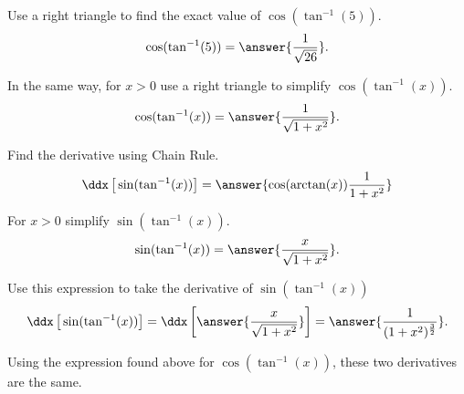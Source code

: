 \documentclass{ximera}
\author{Nela Lakos \and Kyle Parsons \and Bobby Ramsey}
\begin{document}
\begin{exercise}

Use a right triangle to find the exact value of $\cos(\tan^{-1}(5))$.
\[
\cos(\tan^{-1}(5)) = \answer{\frac{1}{\sqrt{26}}}.
\]

In the same way, for $x>0$ use a right triangle to simplify $\cos(\tan^{-1}(x))$.
\[
\cos(\tan^{-1}(x)) = \answer{\frac{1}{\sqrt{1+x^2}}}.
\]

Find the derivative using Chain Rule.
\[
\ddx\left[\vphantom{\ddx}\sin(\tan^{-1}(x))\right] = \answer{\cos(\arctan(x))\frac{1}{1+x^2}}
\]


For $x>0$ simplify $\sin(\tan^{-1}(x))$.
\[
\sin(\tan^{-1}(x)) = \answer{\frac{x}{\sqrt{1+x^2}}}.
\]

Use this expression to take the derivative of $\sin(\tan^{-1}(x))$
\[
\ddx\left[\vphantom{\ddx}\sin(\tan^{-1}(x))\right] = \ddx\left[\vphantom{\ddx}\answer{\frac{x}{\sqrt{1+x^2}}}\right] = \answer{\frac{1}{(1+x^2)^{\frac{3}{2}}}}.
\]

Using the expression found above for $\cos(\tan^{-1}(x))$, these two derivatives are the same.






\end{exercise}
\end{document}
